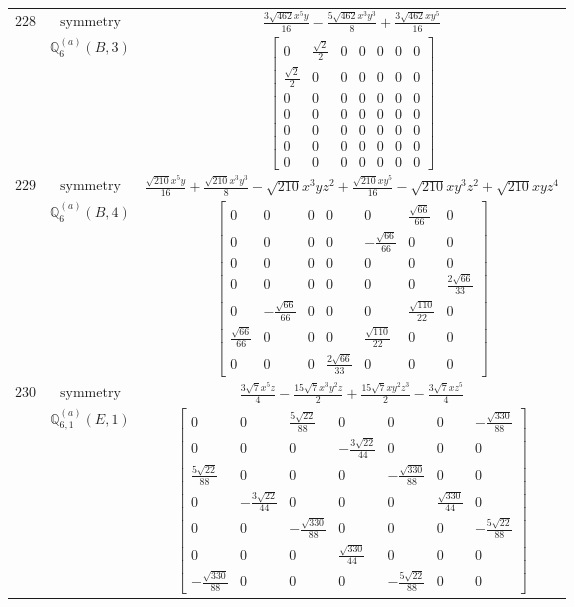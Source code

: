 \documentclass[fleqn,8pt,landscape]{jsarticle}
\begin{document}
\begin{longtable}{ccc}
$ 228 $ & $ \text{symmetry} $ & $ \frac{3 \sqrt{462} x^{5} y}{16} - \frac{5 \sqrt{462} x^{3} y^{3}}{8} + \frac{3 \sqrt{462} x y^{5}}{16} $ \\
$  $ & $ \mathbb{Q}_{6}^{(a)}(B,3) $ & $ \begin{bmatrix} 0 & \frac{\sqrt{2}}{2} & 0 & 0 & 0 & 0 & 0 \\ \frac{\sqrt{2}}{2} & 0 & 0 & 0 & 0 & 0 & 0 \\ 0 & 0 & 0 & 0 & 0 & 0 & 0 \\ 0 & 0 & 0 & 0 & 0 & 0 & 0 \\ 0 & 0 & 0 & 0 & 0 & 0 & 0 \\ 0 & 0 & 0 & 0 & 0 & 0 & 0 \\ 0 & 0 & 0 & 0 & 0 & 0 & 0 \end{bmatrix} $ \\ \hline
$ 229 $ & $ \text{symmetry} $ & $ \frac{\sqrt{210} x^{5} y}{16} + \frac{\sqrt{210} x^{3} y^{3}}{8} - \sqrt{210} x^{3} y z^{2} + \frac{\sqrt{210} x y^{5}}{16} - \sqrt{210} x y^{3} z^{2} + \sqrt{210} x y z^{4} $ \\
$  $ & $ \mathbb{Q}_{6}^{(a)}(B,4) $ & $ \begin{bmatrix} 0 & 0 & 0 & 0 & 0 & \frac{\sqrt{66}}{66} & 0 \\ 0 & 0 & 0 & 0 & - \frac{\sqrt{66}}{66} & 0 & 0 \\ 0 & 0 & 0 & 0 & 0 & 0 & 0 \\ 0 & 0 & 0 & 0 & 0 & 0 & \frac{2 \sqrt{66}}{33} \\ 0 & - \frac{\sqrt{66}}{66} & 0 & 0 & 0 & \frac{\sqrt{110}}{22} & 0 \\ \frac{\sqrt{66}}{66} & 0 & 0 & 0 & \frac{\sqrt{110}}{22} & 0 & 0 \\ 0 & 0 & 0 & \frac{2 \sqrt{66}}{33} & 0 & 0 & 0 \end{bmatrix} $ \\ \hline
$ 230 $ & $ \text{symmetry} $ & $ \frac{3 \sqrt{7} x^{5} z}{4} - \frac{15 \sqrt{7} x^{3} y^{2} z}{2} + \frac{15 \sqrt{7} x y^{2} z^{3}}{2} - \frac{3 \sqrt{7} x z^{5}}{4} $ \\
$  $ & $ \mathbb{Q}_{6,1}^{(a)}(E,1) $ & $ \begin{bmatrix} 0 & 0 & \frac{5 \sqrt{22}}{88} & 0 & 0 & 0 & - \frac{\sqrt{330}}{88} \\ 0 & 0 & 0 & - \frac{3 \sqrt{22}}{44} & 0 & 0 & 0 \\ \frac{5 \sqrt{22}}{88} & 0 & 0 & 0 & - \frac{\sqrt{330}}{88} & 0 & 0 \\ 0 & - \frac{3 \sqrt{22}}{44} & 0 & 0 & 0 & \frac{\sqrt{330}}{44} & 0 \\ 0 & 0 & - \frac{\sqrt{330}}{88} & 0 & 0 & 0 & - \frac{5 \sqrt{22}}{88} \\ 0 & 0 & 0 & \frac{\sqrt{330}}{44} & 0 & 0 & 0 \\ - \frac{\sqrt{330}}{88} & 0 & 0 & 0 & - \frac{5 \sqrt{22}}{88} & 0 & 0 \end{bmatrix} $ \\ \hline

\end{longtable}
\end{document}
